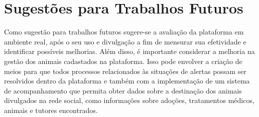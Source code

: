\chapter{Sugestões para Trabalhos Futuros}
    Como sugestão para trabalhos futuros sugere-se a avaliação da plataforma em ambiente real, após o seu uso e divulgação a fim de mensurar sua efetividade e identificar possíveis melhorias. Além disso, é importante considerar a melhoria na gestão dos animais cadastados na plataforma. Isso pode envolver a criação de meios para que todos processos relacionados às situações de alertas possam ser resolvidos dentro da plataforma e também com a implementação de um sistema de acompanhamento que permita obter dados sobre a destinação dos animais divulgados na rede social, como informações sobre adoções, tratamentos médicos, animais e tutores encontrados.
    


